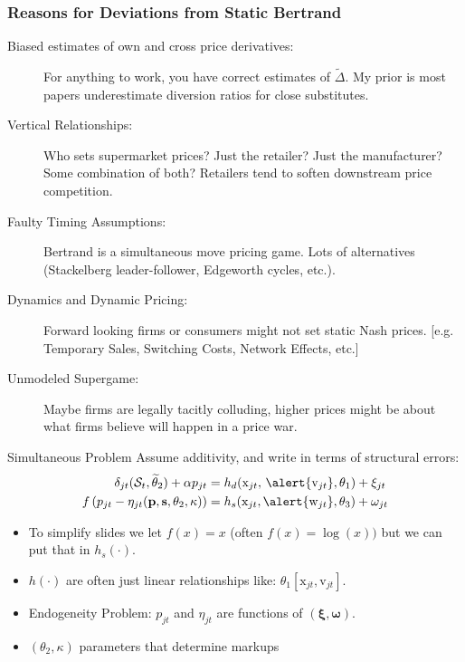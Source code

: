 \documentclass[xcolor=pdftex,dvipsnames,table,mathserif,aspectratio=169]{beamer}
\begin{document}
\begin{frame}
\frametitle{Reasons for Deviations from Static Bertrand}
\small
\begin{description}
\item[Biased estimates of own and cross price derivatives:] For anything to work, you have correct estimates of $\tilde{\Delta}$. My prior is most papers \alert{underestimate} diversion ratios for close substitutes.
\item[Vertical Relationships:] Who sets supermarket prices? Just the retailer? Just the manufacturer? Some combination of both? Retailers tend to \alert{soften} downstream price competition.
\item[Faulty Timing Assumptions:] Bertrand is a simultaneous move pricing game. Lots of alternatives (Stackelberg leader-follower, Edgeworth cycles, etc.).
\item[Dynamics and Dynamic Pricing:] Forward looking firms or consumers might not set static Nash prices. [e.g. Temporary Sales, Switching Costs, Network Effects, etc.]
\item[Unmodeled Supergame:] Maybe firms are legally tacitly colluding, higher prices might be about what firms believe will happen in a price war.
\end{description}
\end{frame}


\begin{frame}{Simultaneous Problem}
Assume additivity, and write in terms of structural errors:
\begin{align*}
\delta_{jt}(\mathcal{S}_t,\widetilde{\theta}_2) + \alpha p_{jt} &= h_d(\textrm{x}_{jt}, \, \alert{\textrm{v}_{jt}},\theta_1)  + \xi_{jt} \\
 f \left( p_{jt} - \eta_{jt}(\mathbf{p},\mathbf{s},\theta_2,\kappa) \right) &= h_s(\textrm{x}_{jt}, \alert{\textrm{w}_{jt}},\theta_3) + \omega_{jt}
\end{align*}
\vspace{-.4cm}
\begin{itemize}
 \item To simplify slides we let $f(x)=x$ (often $f(x) =\log(x))$ but we can put that in $h_s(\cdot)$.
\item $h(\cdot)$ are often just linear relationships like: $\theta_1 [\textrm{x}_{jt}, \textrm{v}_{jt}]$.
\item Endogeneity Problem: $p_{jt}$ and $\eta_{jt}$ are functions of $(\boldsymbol{\xi},\boldsymbol{\omega})$.
\item $(\theta_2, \kappa)$ parameters that determine markups
\end{itemize}
\end{frame}
\end{document}
